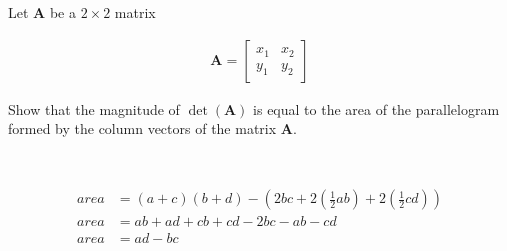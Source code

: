 Let $\boldsymbol{A}$ be a $2 \times 2$ matrix

\begin{align*}
    \boldsymbol{A} = \begin{bmatrix}
        x_1 & x_2 \\
        y_1 & y_2
    \end{bmatrix}
\end{align*}

Show that the magnitude of $\det(\boldsymbol{A})$ is equal to the area of the parallelogram formed by the column vectors of the matrix $\boldsymbol{A}$.

\begin{solution}\ \\    \begin{center}
    \end{center}

    \begin{align*}
        area &= \left(a + c\right)\left(b + d\right) - \left(2bc + 2\left(\frac{1}{2}ab\right) + 2\left(\frac{1}{2}cd\right)\right) \\
        area &= ab + ad + cb + cd - 2bc - ab - cd \\
        area &= ad - bc
    \end{align*}
\end{solution}
